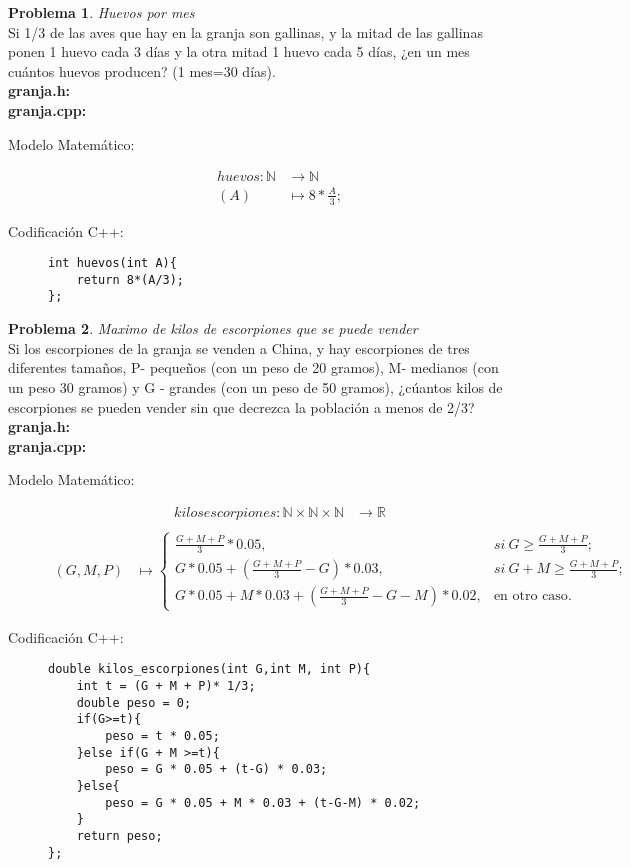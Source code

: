 \documentclass{article}
\theoremstyle{plain}
\theoremstyle{definition}
\newtheorem{problem}{Problema}
\begin{document}
\begin{problem} \emph{Huevos por mes}\\
 Si 1/3 de las aves que hay en la granja son gallinas, y la mitad de las gallinas ponen 1 huevo cada 3 días y la otra mitad 1 huevo cada 5 días, ¿en un mes cuántos huevos producen? (1 mes=30 días).\\
\textbf{granja.h:}\ \\
\textbf{granja.cpp:}\ 
%
\begin{description}
\item[Modelo Matemático:]
%
\begin{align*}
huevos: \mathbb{N} &\to \mathbb{N}\\ 
(A) &\mapsto 8*\frac{A}{3};
\end{align*}

%
\item[Codificación \textsf{C++}:]\hfill
%
\begin{verbatim}
int huevos(int A){
    return 8*(A/3);
};
\end{verbatim}
\end{description}
\end{problem}

\begin{problem} \emph{Maximo de kilos de escorpiones que se puede vender}\\
Si los escorpiones de la granja se venden a China, y hay escorpiones de tres diferentes tamaños, P- pequeños (con un peso de 20 gramos), M- medianos (con un peso 30 gramos) y G - grandes (con un peso de 50 gramos), ¿cúantos kilos de escorpiones se pueden vender sin que decrezca la población a menos de 2/3?\\
\textbf{granja.h:}\ \\
\textbf{granja.cpp:}\ 
%
\begin{description}
\item[Modelo Matemático:]
%
\begin{align*}
kilos escorpiones: \mathbb{N}\times\mathbb{N}\times\mathbb{N} &\to \mathbb{R}\\
\end{align*}
\begin{align*}
(G,M,P) &\mapsto
\begin{cases}
\frac{G+M+P}{3} * 0.05,& si\ G \geq \frac{G+M+P}{3};\\
G * 0.05 + (\frac{G+M+P}{3}-G) * 0.03,& si\ G + M \geq \frac{G+M+P}{3};\\
G * 0.05 + M * 0.03 + (\frac{G+M+P}{3}-G-M) * 0.02,& \text{en otro caso}.
\end{cases}
\end{align*}
%
\item[Codificación \textsf{C++}:]\hfill
%
\begin{verbatim}
double kilos_escorpiones(int G,int M, int P){
    int t = (G + M + P)* 1/3;
    double peso = 0;
    if(G>=t){
        peso = t * 0.05;
    }else if(G + M >=t){
        peso = G * 0.05 + (t-G) * 0.03;
    }else{
        peso = G * 0.05 + M * 0.03 + (t-G-M) * 0.02;
    }
    return peso;
};
\end{verbatim}
\end{description}
\end{problem}
\end{document}
